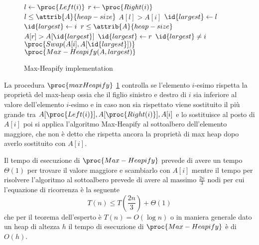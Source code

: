 \begin{figure}
    \caption{Max-Heapify implementation}
    \label{alg:maxHeapify}
    \begin{codebox}
        \li $l \gets \proc{Left(i)}$
        \li $r \gets \proc{Right(i)}$
        \li \If $l \leq \attrib{A}{heap-size}$ \And $A[l] > A[i]$
        \li             $\id{largest} \gets l$
        \li \Else $\id{largest} \gets i$
        \li \If $r \leq \attrib{A}{heap-size}$ \And $A[r] > A[\id{largest}]$
        \li             $\id{largest} \gets r$
            \EndIf
        \li \If $\id{largest} \neq i$
        \li      $\proc{Swap(A[i], A[\id{largest}])}$
        \li      $\proc{Max-Heapify(A, largest)}$
    \end{codebox}
\end{figure}
La procedura $\proc{maxHeapify}$ \ref{alg:maxHeapify} controlla se l'elemento $i$-esimo rispetta la proprietà del max-heap ossia che il figlio sinistro e destro di $i$ sia 
inferiore al valore dell'elemento $i$-esimo e in caso non sia rispettato viene sostituito il più grande tra $A[\proc{Left(i)}], A[\proc{Right(i)}], A[i]$ e lo sostituisce 
al posto di $A[i]$ poi si applica l'algoritmo Max-Heapify al sottoalbero dell'elemento maggiore, che non è detto che rispetta ancora
la proprietà di max heap dopo averlo sostituito con $A[i]$.

Il tempo di esecuzione di $\proc{Max-Heapify}$ prevede di avere un tempo $\Theta(1)$ per trovare il valore maggiore e scambiarlo con $A[i]$ mentre il tempo per 
risolvere l'algoritmo al sottoalbero prevede di avere al massimo $\frac{2n}{3}$  nodi per cui l'equazione di ricorrenza è la seguente
\[ T(n) \leq T(\frac{2n}{3}) + \Theta(1) \]
che per il teorema dell'esperto è $T(n) = O(\log n)$ o in maniera generale dato un heap di altezza $h$ il tempo di esecuzione di $\proc{Max-Heapify}$ è di $O(h)$.




